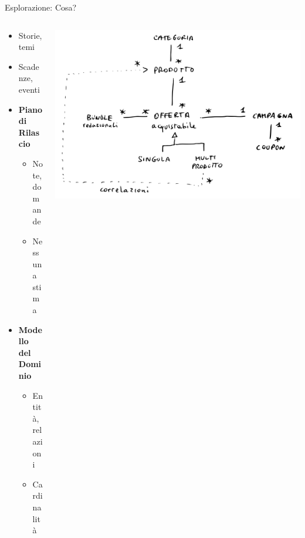 \documentclass[compress, red, 14pt]{beamer}
\begin{document}
	\begin{frame}{Esplorazione: Cosa?}

		\begin{columns}[T]
		    \begin{column}{.5\textwidth}

				\begin{itemize}
					\item Storie, temi
					\item Scadenze, eventi
				\end{itemize}

				\begin{itemize}
					\item \textbf{Piano di Rilascio}
					\begin{itemize}
						\item Note, domande
						\item Nessuna stima
					\end{itemize}
					\item \textbf{Modello \\ del Dominio}
					\begin{itemize}
						\item Entità, relazioni
						\item Cardinalità
					\end{itemize}
				\end{itemize}
				
	    \end{column}
	    \begin{column}{.5\textwidth}
			\hspace*{-0.6cm}
		    \includegraphics[scale=0.18]{images/domain.png}
	    \end{column}
	 \end{columns}
	\end{frame}
\end{document}
